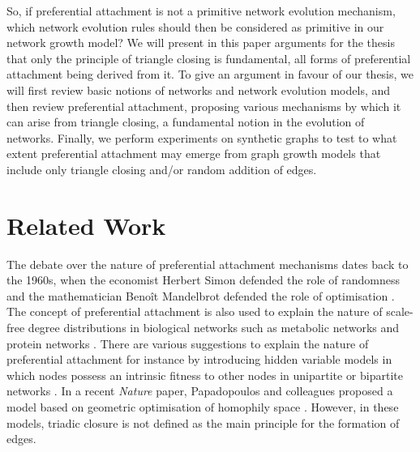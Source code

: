 \documentclass{jimis-final-en}
\begin{document}
So, if preferential attachment is not a primitive network evolution
mechanism, which network evolution rules should then be considered as
primitive in our network growth model?  We will
present in this paper arguments for the thesis that
only the principle of triangle closing is fundamental, all forms of
preferential attachment being derived from it. 
To give an
argument in favour of our thesis, we will first review basic notions of
networks and network evolution models, and then review 
preferential attachment, proposing various mechanisms by which
it can arise from triangle closing, a fundamental notion in the
evolution of networks. 
Finally, we perform experiments on synthetic graphs to test to what
extent preferential attachment may emerge from graph growth models that
include only triangle closing and/or random addition of edges. 

\section{Related Work}
The debate over the nature of preferential attachment mechanisms dates
back to the 1960s, when the economist Herbert Simon defended the role of
randomness and the mathematician Benoît Mandelbrot defended the role of
optimisation \citep{barabasi2012network}. The concept of preferential
attachment is also used to explain the nature of scale-free degree
distributions in biological networks such as metabolic networks
\citep{jeong2000large} and protein networks
\citep{jeong2001lethality}. There are various suggestions to explain the
nature of preferential attachment for instance by introducing  hidden variable
models in which nodes possess an intrinsic fitness to other nodes in
unipartite \citep{boguna2003class} or bipartite networks
\citep{kitsak2011}. In a recent \emph{Nature} paper, Papadopoulos and
colleagues proposed a model based on geometric optimisation of homophily
space  
\citeyearpar{papadopoulos2012popularity}. However, in these models, 
triadic closure is not defined as the main principle for the formation
of edges.  
\end{document}
